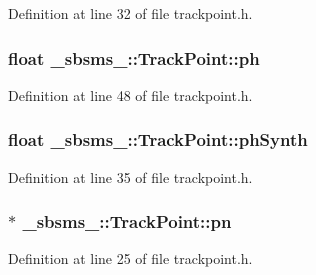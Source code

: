 Definition at line 32 of file trackpoint.\+h.

\subsubsection[{\texorpdfstring{ph}{ph}}]{\setlength{\rightskip}{0pt plus 5cm}float \+\_\+sbsms\+\_\+\+::\+Track\+Point\+::ph\hspace{0.3cm}{\ttfamily [protected]}}\hypertarget{class__sbsms___1_1_track_point_afa39d2e7c8f3ddc23e5ced47564ab01e}{}\label{class__sbsms___1_1_track_point_afa39d2e7c8f3ddc23e5ced47564ab01e}


Definition at line 48 of file trackpoint.\+h.

\subsubsection[{\texorpdfstring{ph\+Synth}{phSynth}}]{\setlength{\rightskip}{0pt plus 5cm}float \+\_\+sbsms\+\_\+\+::\+Track\+Point\+::ph\+Synth\hspace{0.3cm}{\ttfamily [protected]}}\hypertarget{class__sbsms___1_1_track_point_a253c7f904e8090210a000e82c7117e75}{}\label{class__sbsms___1_1_track_point_a253c7f904e8090210a000e82c7117e75}


Definition at line 35 of file trackpoint.\+h.

\subsubsection[{\texorpdfstring{pn}{pn}}]{$\ast$ \+\_\+sbsms\+\_\+\+::\+Track\+Point\+::pn\hspace{0.3cm}{\ttfamily [protected]}}\hypertarget{class__sbsms___1_1_track_point_a371956abd2d2e88a0868f5d297a920fe}{}\label{class__sbsms___1_1_track_point_a371956abd2d2e88a0868f5d297a920fe}


Definition at line 25 of file trackpoint.\+h.


